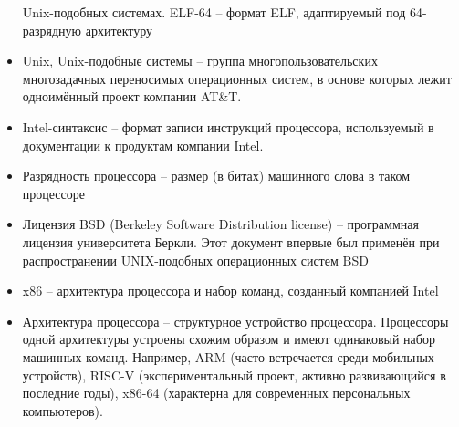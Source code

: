 \documentclass[a4paper]{article}
\begin{document}
\begin{itemize}
			Unix-подобных системах. ELF-64 -- формат ELF,
			адаптируемый под 64-разрядную архитектуру
		\item Unix, Unix-подобные системы -- группа
			многопользовательских многозадачных переносимых
			операционных систем, в основе которых лежит одноимённый
			проект компании AT\&T.
		\item Intel-синтаксис -- формат записи инструкций процессора,
			используемый в документации к продуктам компании Intel.
		\item Разрядность процессора -- размер (в битах) машинного
			слова в таком процессоре
		\item Лицензия BSD (Berkeley Software Distribution license) --
			программная лицензия университета Беркли. Этот документ
			впервые был применён при распространении UNIX-подобных
			операционных систем BSD
		\item x86 -- архитектура процессора и набор команд, созданный
			компанией Intel
		\item Архитектура процессора -- структурное устройство
			процессора. Процессоры одной архитектуры устроены схожим
			образом и имеют одинаковый набор машинных команд.
			Например, ARM (часто встречается среди мобильных
			устройств), RISC-V (экспериментальный проект, активно
			развивающийся в последние годы), x86-64 (характерна для
			современных персональных компьютеров).  \end{itemize}
\end{document}
